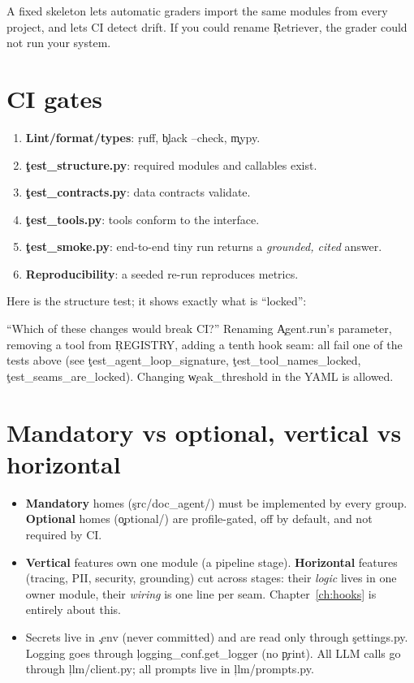 \begin{why}
A fixed skeleton lets automatic graders import the same modules from every project, and lets CI detect drift. If you could rename \c{Retriever}, the grader could not run your system.
\end{why}

\section{CI gates}
\begin{enumerate}
 \item \textbf{Lint/format/types}: \c{ruff}, \c{black --check}, \c{mypy}.
 \item \textbf{\c{test\_structure.py}}: required modules and callables exist.
 \item \textbf{\c{test\_contracts.py}}: data contracts validate.
 \item \textbf{\c{test\_tools.py}}: tools conform to the interface.
 \item \textbf{\c{test\_smoke.py}}: end-to-end tiny run returns a \emph{grounded, cited} answer.
 \item \textbf{Reproducibility}: a seeded re-run reproduces metrics.
\end{enumerate}
Here is the structure test; it shows exactly what is ``locked'':
\begin{tip}
``Which of these changes would break CI?'' Renaming \c{Agent.run}'s parameter, removing a tool from \c{REGISTRY}, adding a tenth hook seam: all fail one of the tests above (see \c{test\_agent\_loop\_signature}, \c{test\_tool\_names\_locked}, \c{test\_seams\_are\_locked}). Changing \c{weak\_threshold} in the YAML is allowed.
\end{tip}

\section{Mandatory vs optional, vertical vs horizontal}
\begin{itemize}
 \item \textbf{Mandatory} homes (\c{src/doc\_agent/}) must be implemented by every group. \textbf{Optional} homes (\c{optional/}) are profile-gated, off by default, and not required by CI.
 \item \textbf{Vertical} features own one module (a pipeline stage). \textbf{Horizontal} features (tracing, PII, security, grounding) cut across stages: their \emph{logic} lives in one owner module, their \emph{wiring} is one line per seam. Chapter~\ref{ch:hooks} is entirely about this.
 \item Secrets live in \c{.env} (never committed) and are read only through \c{settings.py}. Logging goes through \c{logging\_conf.get\_logger} (no \c{print}). All LLM calls go through \c{llm/client.py}; all prompts live in \c{llm/prompts.py}.
\end{itemize}

